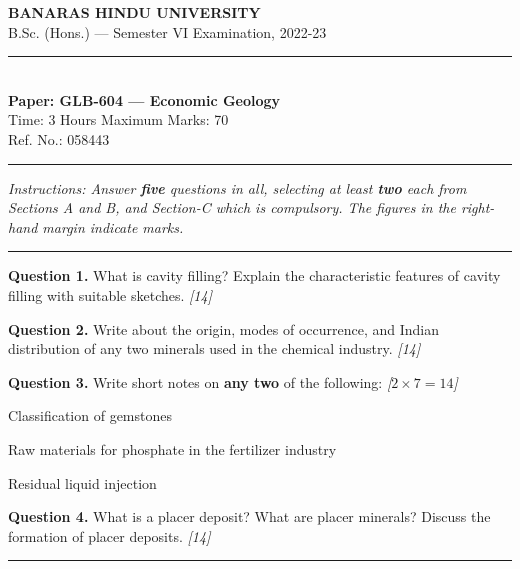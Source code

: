 \documentclass[11pt,a4paper]{article}
\newcommand{\pts}[1]{\hfill   \textit{[#1]}}
\begin{document}
\begin{center}
  {\large\bfseries BANARAS HINDU UNIVERSITY}\\[2pt]
  {\normalsize B.Sc. (Hons.) --- Semester VI Examination, 2022-23}\\[6pt]
  \rule{0.8\linewidth}{0.5pt}\\[6pt]
  {\large\bfseries Paper: GLB-604 --- Economic Geology}\\[4pt]
  {\normalsize Time: 3 Hours \hfill Maximum Marks: 70}\\[2pt]
  {\small Ref. No.: 058443}
\end{center}
\rule{\linewidth}{0.4pt}
\smallskip



\noindent   \textit{Instructions: Answer   \textbf{five} questions in all, selecting at least   \textbf{two} each from Sections A and B, and Section-C which is compulsory. The figures in the right-hand margin indicate marks.}
\bigskip

\bigskip


\rule{\linewidth}{0.4pt}\smallskip




\noindent   \textbf{Question 1.} What is cavity filling? Explain the characteristic features of cavity filling with suitable sketches. \pts{14}

\medskip


\noindent   \textbf{Question 2.} Write about the origin, modes of occurrence, and Indian distribution of any two minerals used in the chemical industry. \pts{14}

\medskip


\noindent   \textbf{Question 3.} Write short notes on   \textbf{any two} of the following: \pts{$2  \times 7 = 14$}

\begin{parts}
  \item Classification of gemstones
  \item Raw materials for phosphate in the fertilizer industry
  \item Residual liquid injection
\end{parts}

\medskip


\noindent   \textbf{Question 4.} What is a placer deposit? What are placer minerals? Discuss the formation of placer deposits. \pts{14}

\bigskip


\rule{\linewidth}{0.4pt}\smallskip
\end{document}
